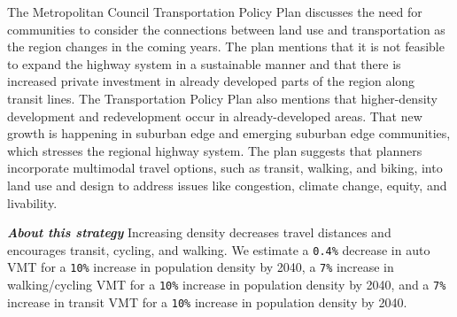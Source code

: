 \documentclass[
]{book}
\begin{document}
The Metropolitan Council Transportation Policy Plan discusses the need for communities to consider the connections between land use and transportation as the region changes in the coming years. The plan mentions that it is not feasible to expand the highway system in a sustainable manner and that there is increased private investment in already developed parts of the region along transit lines. The Transportation Policy Plan also mentions that higher-density development and redevelopment occur in already-developed areas. That new growth is happening in suburban edge and emerging suburban edge communities, which stresses the regional highway system. The plan suggests that planners incorporate multimodal travel options, such as transit, walking, and biking, into land use and design to address issues like congestion, climate change, equity, and livability.

\textbf{\emph{About this strategy}} Increasing density decreases travel distances and encourages transit, cycling, and walking. We estimate a \texttt{0.4\%} decrease in auto VMT for a \texttt{10\%} increase in population density by 2040, a \texttt{7\%} increase in walking/cycling VMT for a \texttt{10\%} increase in population density by 2040, and a \texttt{7\%} increase in transit VMT for a \texttt{10\%} increase in population density by 2040.
\end{document}
